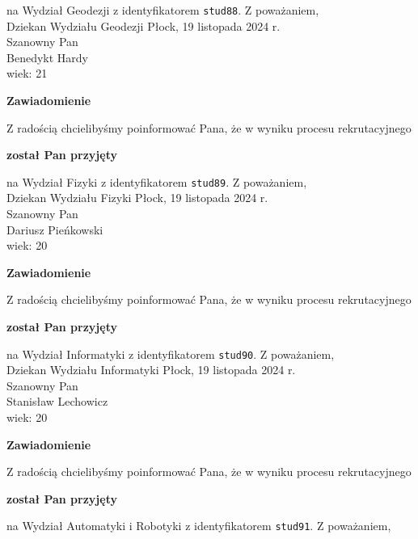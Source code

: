 \documentclass[12pt,a4paper]{article}
\begin{document}
na Wydział Geodezji z identyfikatorem \verb|stud88|. 
\vspace{2cm}
\noindent
Z poważaniem, \\
Dziekan
Wydziału Geodezji
\newpage
\hfill Płock, 19 listopada 2024 r. \\
\noindent
Szanowny Pan \\
Benedykt Hardy \\
wiek: 21
\bigskip
\begin{center}
    {\Large\textbf{Zawiadomienie}}
\end{center}
\bigskip 
Z radością chcielibyśmy poinformować Pana, że w wyniku procesu rekrutacyjnego
\begin{center}
\textsf{\textbf{został Pan przyjęty}}
\end{center}
na Wydział Fizyki z identyfikatorem \verb|stud89|. 
\vspace{2cm}
\noindent
Z poważaniem, \\
Dziekan
Wydziału Fizyki
\newpage
\hfill Płock, 19 listopada 2024 r. \\
\noindent
Szanowny Pan \\
Dariusz Pieńkowski \\
wiek: 20
\bigskip
\begin{center}
    {\Large\textbf{Zawiadomienie}}
\end{center}
\bigskip 
Z radością chcielibyśmy poinformować Pana, że w wyniku procesu rekrutacyjnego
\begin{center}
\textsf{\textbf{został Pan przyjęty}}
\end{center}
na Wydział Informatyki z identyfikatorem \verb|stud90|. 
\vspace{2cm}
\noindent
Z poważaniem, \\
Dziekan
Wydziału Informatyki
\newpage
\hfill Płock, 19 listopada 2024 r. \\
\noindent
Szanowny Pan \\
Stanisław Lechowicz \\
wiek: 20
\bigskip
\begin{center}
    {\Large\textbf{Zawiadomienie}}
\end{center}
\bigskip 
Z radością chcielibyśmy poinformować Pana, że w wyniku procesu rekrutacyjnego
\begin{center}
\textsf{\textbf{został Pan przyjęty}}
\end{center}
na Wydział Automatyki i Robotyki z identyfikatorem \verb|stud91|. 
\vspace{2cm}
\noindent
Z poważaniem, \\
\end{document}
